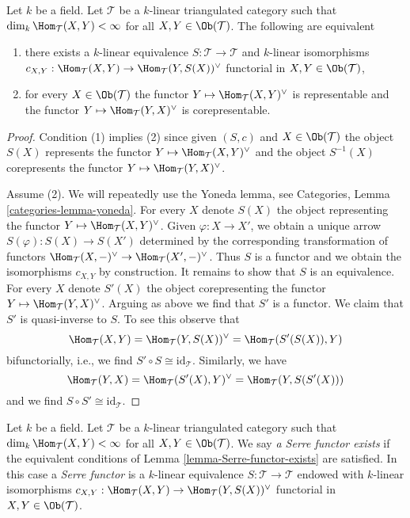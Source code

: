 \begin{lemma}
\label{lemma-Serre-functor-exists}
Let $k$ be a field. Let $\mathcal{T}$ be a $k$-linear
triangulated category such that $\dim_k \Hom_\mathcal{T}(X, Y) < \infty$
for all $X, Y \in \Ob(\mathcal{T})$. The following are equivalent
\begin{enumerate}
\item there exists a $k$-linear equivalence
$S : \mathcal{T} \to \mathcal{T}$ and $k$-linear isomorphisms
$c_{X, Y} : \Hom_\mathcal{T}(X, Y) \to \Hom_\mathcal{T}(Y, S(X))^\vee$
functorial in $X, Y \in \Ob(\mathcal{T})$,
\item for every $X \in \Ob(\mathcal{T})$
the functor $Y \mapsto \Hom_\mathcal{T}(X, Y)^\vee$
is representable and the functor $Y \mapsto \Hom_\mathcal{T}(Y, X)^\vee$
is corepresentable.
\end{enumerate}
\end{lemma}

\begin{proof}
Condition (1) implies (2) since given $(S, c)$ and $X \in \Ob(\mathcal{T})$
the object $S(X)$ represents the functor
$Y \mapsto \Hom_\mathcal{T}(X, Y)^\vee$ and the object $S^{-1}(X)$ corepresents
the functor $Y \mapsto \Hom_\mathcal{T}(Y, X)^\vee$.

\medskip\noindent
Assume (2). We will repeatedly use the Yoneda lemma, see
Categories, Lemma \ref{categories-lemma-yoneda}.
For every $X$ denote $S(X)$ the object representing the
functor $Y \mapsto \Hom_\mathcal{T}(X, Y)^\vee$. Given
$\varphi : X \to X'$, we obtain a unique arrow $S(\varphi) : S(X) \to S(X')$
determined by the corresponding transformation of functors
$\Hom_\mathcal{T}(X, -)^\vee \to \Hom_\mathcal{T}(X', -)^\vee$.
Thus $S$ is a functor and we obtain the isomorphisms $c_{X, Y}$
by construction. It remains to show that $S$ is an equivalence.
For every $X$ denote $S'(X)$ the object corepresenting the
functor $Y \mapsto \Hom_\mathcal{T}(Y, X)^\vee$. Arguing as
above we find that $S'$ is a functor. We claim that $S'$
is quasi-inverse to $S$. To see this observe that
$$
\Hom_\mathcal{T}(X, Y) = \Hom_\mathcal{T}(Y, S(X))^\vee =
\Hom_\mathcal{T}(S'(S(X)), Y)
$$
bifunctorially, i.e., we find $S' \circ S \cong \text{id}_\mathcal{T}$.
Similarly, we have
$$
\Hom_\mathcal{T}(Y, X) = \Hom_\mathcal{T}(S'(X), Y)^\vee =
\Hom_\mathcal{T}(Y, S(S'(X)))
$$
and we find $S \circ S' \cong \text{id}_\mathcal{T}$.
\end{proof}

\begin{definition}
\label{definition-Serre-functor}
Let $k$ be a field. Let $\mathcal{T}$ be a $k$-linear
triangulated category such that $\dim_k \Hom_\mathcal{T}(X, Y) < \infty$
for all $X, Y \in \Ob(\mathcal{T})$. We say {\it a Serre functor
exists} if the equivalent conditions of Lemma \ref{lemma-Serre-functor-exists}
are satisfied. In this case a {\it Serre functor} is a $k$-linear equivalence
$S : \mathcal{T} \to \mathcal{T}$ endowed with $k$-linear isomorphisms
$c_{X, Y} : \Hom_\mathcal{T}(X, Y) \to \Hom_\mathcal{T}(Y, S(X))^\vee$
functorial in $X, Y \in \Ob(\mathcal{T})$.
\end{definition}

